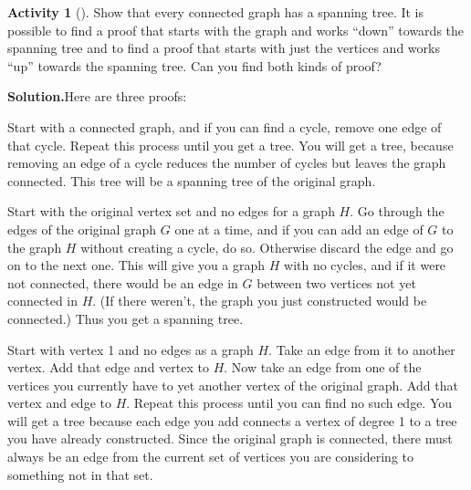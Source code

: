 \documentclass[10pt,]{book}
\theoremstyle{plain}
\theoremstyle{definition}
\newtheorem{activity}[project]{Activity}
\numberwithin{equation}{chapter}
\begin{document}
\begin{activity}[]\label{activity-107}
Show that every connected graph has a spanning tree. It is possible to find a proof that starts with the graph and works ``down'' towards the spanning tree and to find a proof that starts with just the vertices and works ``up'' towards the spanning tree. Can you find both kinds of proof?%
\par\medskip\noindent%
\textbf{Solution.}\quad Here are three proofs:%
\par
Start with a connected graph, and if you can find a cycle, remove one edge of that cycle. Repeat this process until you get a tree. You will get a tree, because removing an edge of a cycle reduces the number of cycles but leaves the graph connected. This tree will be a spanning tree of the original graph.%
\par
Start with the original vertex set and no edges for a graph \(H\). Go through the edges of the original graph \(G\) one at a time, and if you can add an edge of \(G\) to the graph \(H\) without creating a cycle, do so. Otherwise discard the edge and go on to the next one. This will give you a graph \(H\) with no cycles, and if it were not connected, there would be an edge in \(G\) between two vertices not yet connected in \(H\). (If there weren't, the graph you just constructed would be connected.) Thus you get a spanning tree.%
\par
Start with vertex 1 and no edges as a graph \(H\). Take an edge from it to another vertex. Add that edge and vertex to \(H\). Now take an edge from one of the vertices you currently have to yet another vertex of the original graph. Add that vertex and edge to \(H\). Repeat this process until you can find no such edge. You will get a tree because each edge you add connects a vertex of degree 1 to a tree you have already constructed. Since the original graph is connected, there must always be an edge from the current set of vertices you are considering to something not in that set.%
\end{activity}
\typeout{************************************************}
\typeout{************************************************}
\end{document}
